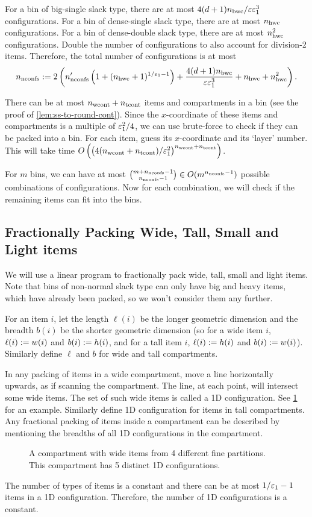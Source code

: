 For a bin of big-single slack type, there are at most $4(d+1)n_{\mathrm{bwc}}/\varepsilon\varepsilon_1^3$
configurations. For a bin of dense-single slack type, there are at most
$n_{\mathrm{hwc}}$ configurations. For a bin of dense-double slack type, there are at most
$n_{\mathrm{hwc}}^2$ configurations.
Double the number of configurations to also account for division-2 items.
Therefore, the total number of configurations is at most
\[ n_{\mathrm{nconfs}} := 2\left(n_{\mathrm{nconfs}}'\left(1 + (n_{\mathrm{hwc}} + 1)^{1/\varepsilon_1-1}\right)
    + \frac{4(d+1)n_{\mathrm{bwc}}}{\varepsilon\varepsilon_1^3} + n_{\mathrm{hwc}} + n_{\mathrm{hwc}}^2\right). \]

There can be at most $n_{\mathrm{wcont}} + n_{\mathrm{tcont}}$ items and compartments in a bin
(see the proof of \cref{lem:ss-to-round-cont}).
Since the $x$-coordinate of these items and compartments is a multiple of $\varepsilon_1^2/4$,
we can use brute-force to check if they can be packed into a bin.
For each item, guess its $x$-coordinate and its `layer' number.
This will take time
$O\left(\left(4(n_{\mathrm{wcont}} + n_{\mathrm{tcont}})/\varepsilon_1^2\right)^{n_{\mathrm{wcont}} + n_{\mathrm{tcont}}}\right)$.

For $m$ bins, we can have at most $\binom{m+n_{\mathrm{nconfs}}-1}{n_{\mathrm{nconfs}}-1} \in O(m^{n_{\mathrm{nconfs}}-1})$
possible combinations of configurations. Now for each combination,
we will check if the remaining items can fit into the bins.

\subsection{Fractionally Packing Wide, Tall, Small and Light items}

We will use a linear program to fractionally pack wide, tall, small and light items.
Note that bins of non-normal slack type can only have big and heavy items,
which have already been packed, so we won't consider them any further.

\begin{definition}
For an item $i$, let the length $\ell(i)$ be the longer geometric dimension
and the breadth $b(i)$ be the shorter geometric dimension
(so for a wide item $i$, $\ell(i) := w(i)$ and $b(i) := h(i)$,
and for a tall item $i$, $\ell(i) := h(i)$ and $b(i) := w(i)$).
Similarly define $\ell$ and $b$ for wide and tall compartments.
\end{definition}

In any packing of items in a wide compartment, move a line horizontally upwards,
as if scanning the compartment. The line, at each point, will intersect some wide items.
The set of such wide items is called a 1D configuration.
See \cref{fig:1d-configs} for an example.
Similarly define 1D configuration for items in tall compartments.
Any fractional packing of items inside a compartment can be described
by mentioning the breadths of all 1D configurations in the compartment.
\begin{figure}[htb]
\centering

\caption{A compartment with wide items from 4 different fine partitions.
This compartment has 5 distinct 1D configurations.}
\label{fig:1d-configs}
\end{figure}
The number of types of items is a constant and there can be at most $1/\varepsilon_1-1$
items in a 1D configuration. Therefore, the number of 1D configurations is a constant.

